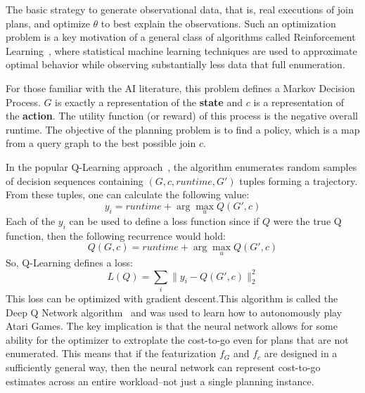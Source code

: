 The basic strategy to generate observational data, that is, real executions of join plans, and optimize $\theta$ to best explain the observations. Such an optimization problem is a key motivation of a general class of algorithms called Reinforcement Learning~\cite{sutton1998reinforcement}, where statistical machine learning techniques are used to approximate optimal behavior while observing substantially less data that full enumeration. 

For those familiar with the AI literature, this problem defines a Markov Decision Process. $G$ is exactly a representation of the \textbf{state} and $c$ is a representation of the \textbf{action}.
The utility function (or reward) of this process is the negative overall runtime.
The objective of the planning problem is to find a policy, which is a map from a query graph to the best possible join $c$.

In the popular Q-Learning approach~\cite{sutton1998reinforcement}, the algorithm enumerates random samples of decision sequences containing $(G,c, runtime, G')$ tuples forming a trajectory. From these tuples, one can calculate the following value:
\[
y_i = runtime + \arg \max_{u} Q(G',c)
\]
Each of the $y_i$ can be used to define a loss function since if $Q$ were the true Q function, then the following recurrence would hold:
\[
Q(G,c) = runtime + \arg \max_{u} Q(G',c)
\]
So, Q-Learning defines a loss:
\[
L(Q) = \sum_{i} \|y_i - Q(G',c)\|_2^2
\]
This loss can be optimized with gradient descent.This algorithm is called the Deep Q Network algorithm~\cite{mnih2015human} and was used to learn how to autonomously play Atari Games.
The key implication is that the neural network allows for some ability for the optimizer to extroplate the cost-to-go even for plans that are not enumerated. This means that if the featurization $f_G$ and $f_c$ are designed in a sufficiently general way, then the neural network can represent cost-to-go estimates across an entire workload--not just a single planning instance.
